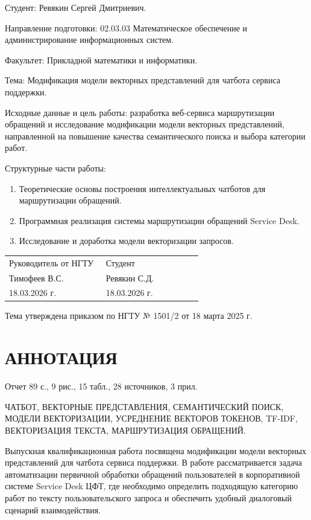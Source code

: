 \documentclass[14pt,a4paper]{extarticle}
\numberwithin{figure}{section}
\numberwithin{table}{section}
\begin{document}
Студент: Ревякин Сергей Дмитриевич.

Направление подготовки: 02.03.03 Математическое обеспечение и администрирование информационных систем.

Факультет: Прикладной математики и информатики.

Тема: Модификация модели векторных представлений для чатбота сервиса поддержки.

Исходные данные и цель работы: разработка веб-сервиса маршрутизации обращений и исследование модификации модели векторных представлений, направленной на повышение качества семантического поиска и выбора категории работ.

Структурные части работы:
\begin{enumerate}
\item Теоретические основы построения интеллектуальных чатботов для маршрутизации обращений.
\item Программная реализация системы маршрутизации обращений Service Desk.
\item Исследование и доработка модели векторизации запросов.
\end{enumerate}

\vspace{10mm}
\begin{tabular}{p{0.48\linewidth}p{0.48\linewidth}}
Руководитель от НГТУ & Студент\\
Тимофеев В.С. & Ревякин С.Д.\\
18.03.2026 г. & 18.03.2026 г.\\
\end{tabular}

\vfill
Тема утверждена приказом по НГТУ № 1501/2 от 18 марта 2025 г.
\clearpage
\section*{АННОТАЦИЯ}

Отчет 89 с., 9 рис., 15 табл., 28 источников, 3 прил.

ЧАТБОТ, ВЕКТОРНЫЕ ПРЕДСТАВЛЕНИЯ, СЕМАНТИЧЕСКИЙ ПОИСК,
МОДЕЛИ ВЕКТОРИЗАЦИИ, УСРЕДНЕНИЕ ВЕКТОРОВ ТОКЕНОВ,
TF-IDF, ВЕКТОРИЗАЦИЯ ТЕКСТА, МАРШРУТИЗАЦИЯ ОБРАЩЕНИЙ.

Выпускная квалификационная работа посвящена модификации модели
векторных представлений для чатбота сервиса поддержки. В работе рассматривается
задача автоматизации первичной обработки обращений пользователей в
корпоративной системе Service Desk ЦФТ, где необходимо определить
подходящую категорию работ по тексту пользовательского запроса и
обеспечить удобный диалоговый сценарий взаимодействия.
\end{document}
